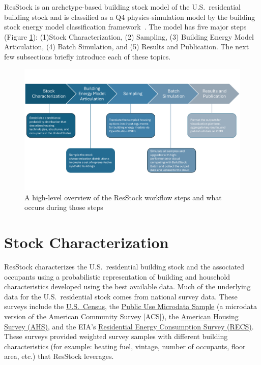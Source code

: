 ResStock is an archetype-based building stock model of the U.S.~residential building stock and is classified as a Q4 physics-simulation model by the building stock energy model classification framework~\citep{Langevin2020}. The model has five major steps (Figure \ref{fig:workflow_overview}): (1)Stock Characterization, (2) Sampling, (3) Building Energy Model Articulation, (4) Batch Simulation, and (5) Results and Publication. The next few subsections briefly introduce each of these topics.

\begin{figure}
    \centering
    \includegraphics[width=1\linewidth]{images/Figure 1.pdf}
    \caption{A high-level overview of the ResStock workflow steps and what occurs during those steps}
    \label{fig:workflow_overview}
\end{figure}

\section{Stock Characterization}
ResStock characterizes the U.S.~residential building stock and the associated occupants using a probabilistic representation of building and household characteristics developed using the best available data. Much of the underlying data for the U.S.~residential stock comes from national survey data. These surveys include the \href{https://data.census.gov/}{U.S.~Census}, the \href{https://www.census.gov/programs-surveys/acs/microdata.html}{Public Use Microdata Sample} (a microdata version of the American Community Survey [ACS]), the \href{https://www.census.gov/programs-surveys/ahs.html}{American Housing Survey (AHS)}, and the EIA's \href{https://www.eia.gov/consumption/residential/}{Residential Energy Consumption Survey (RECS)}. These surveys provided weighted survey samples with different building characteristics (for example: heating fuel, vintage, number of occupants, floor area, etc.) that ResStock leverages.

